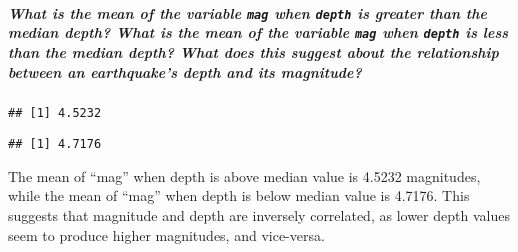 \documentclass[
]{article}
\newenvironment{Shaded}{\begin{snugshade}}{\end{snugshade}}
\newcommand{\FunctionTok}[1]{\textcolor[rgb]{0.00,0.00,0.00}{#1}}
\newcommand{\NormalTok}[1]{#1}
\newcommand{\SpecialCharTok}[1]{\textcolor[rgb]{0.00,0.00,0.00}{#1}}
\begin{document}
\hypertarget{what-is-the-mean-of-the-variable-mag-when-depth-is-greater-than-the-median-depth-what-is-the-mean-of-the-variable-mag-when-depth-is-less-than-the-median-depth-what-does-this-suggest-about-the-relationship-between-an-earthquakes-depth-and-its-magnitude}{%
\subparagraph{\texorpdfstring{What is the mean of the variable
\texttt{mag} when \texttt{depth} is \emph{greater than} the median
depth? What is the mean of the variable \texttt{mag} when \texttt{depth}
is \emph{less than} the median depth? What does this suggest about the
relationship between an earthquake's depth and its
magnitude?}{What is the mean of the variable mag when depth is greater than the median depth? What is the mean of the variable mag when depth is less than the median depth? What does this suggest about the relationship between an earthquake's depth and its magnitude?}}\label{what-is-the-mean-of-the-variable-mag-when-depth-is-greater-than-the-median-depth-what-is-the-mean-of-the-variable-mag-when-depth-is-less-than-the-median-depth-what-does-this-suggest-about-the-relationship-between-an-earthquakes-depth-and-its-magnitude}}

\begin{Shaded}
\end{Shaded}

\begin{verbatim}
## [1] 4.5232
\end{verbatim}

\begin{Shaded}
\end{Shaded}

\begin{verbatim}
## [1] 4.7176
\end{verbatim}

The mean of ``mag'' when depth is above median value is 4.5232
magnitudes, while the mean of ``mag'' when depth is below median value
is 4.7176. This suggests that magnitude and depth are inversely
correlated, as lower depth values seem to produce higher magnitudes, and
vice-versa.
\end{document}
